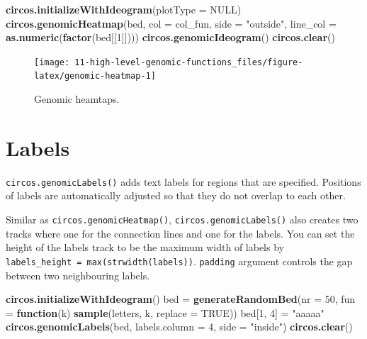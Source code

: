 \documentclass[]{book}
\newenvironment{Shaded}{\begin{snugshade}}{\end{snugshade}}
\newcommand{\KeywordTok}[1]{\textcolor[rgb]{0.13,0.29,0.53}{\textbf{#1}}}
\newcommand{\DataTypeTok}[1]{\textcolor[rgb]{0.13,0.29,0.53}{#1}}
\newcommand{\DecValTok}[1]{\textcolor[rgb]{0.00,0.00,0.81}{#1}}
\newcommand{\StringTok}[1]{\textcolor[rgb]{0.31,0.60,0.02}{#1}}
\newcommand{\OtherTok}[1]{\textcolor[rgb]{0.56,0.35,0.01}{#1}}
\newcommand{\ControlFlowTok}[1]{\textcolor[rgb]{0.13,0.29,0.53}{\textbf{#1}}}
\newcommand{\NormalTok}[1]{#1}
\begin{document}
\begin{Shaded}
\begin{Highlighting}[]
\KeywordTok{circos.initializeWithIdeogram}\NormalTok{(}\DataTypeTok{plotType =} \OtherTok{NULL}\NormalTok{)}
\KeywordTok{circos.genomicHeatmap}\NormalTok{(bed, }\DataTypeTok{col =}\NormalTok{ col_fun, }\DataTypeTok{side =} \StringTok{"outside"}\NormalTok{,}
    \DataTypeTok{line_col =} \KeywordTok{as.numeric}\NormalTok{(}\KeywordTok{factor}\NormalTok{(bed[[}\DecValTok{1}\NormalTok{]])))}
\KeywordTok{circos.genomicIdeogram}\NormalTok{()}
\KeywordTok{circos.clear}\NormalTok{()}
\end{Highlighting}
\end{Shaded}

\begin{figure}

{\centering \texttt{[image: 11-high-level-genomic-functions\_files/figure-latex/genomic-heatmap-1]} 

}

\caption{Genomic heamtaps.}\label{fig:genomic-heatmap}
\end{figure}

\section{Labels}\label{labels}

\texttt{circos.genomicLabels()} adds text labels for regions that are
specified. Positions of labels are automatically adjusted so that they
do not overlap to each other.

Similar as \texttt{circos.genomicHeatmap()},
\texttt{circos.genomicLabels()} also creates two tracks where one for
the connection lines and one for the labels. You can set the height of
the labels track to be the maximum width of labels by
\texttt{labels\_height\ =\ max(strwidth(labels))}. \texttt{padding}
argument controls the gap between two neighbouring labels.

\begin{Shaded}
\begin{Highlighting}[]
\KeywordTok{circos.initializeWithIdeogram}\NormalTok{()}
\NormalTok{bed =}\StringTok{ }\KeywordTok{generateRandomBed}\NormalTok{(}\DataTypeTok{nr =} \DecValTok{50}\NormalTok{, }\DataTypeTok{fun =} \ControlFlowTok{function}\NormalTok{(k) }\KeywordTok{sample}\NormalTok{(letters, k, }\DataTypeTok{replace =} \OtherTok{TRUE}\NormalTok{))}
\NormalTok{bed[}\DecValTok{1}\NormalTok{, }\DecValTok{4}\NormalTok{] =}\StringTok{ "aaaaa"}
\KeywordTok{circos.genomicLabels}\NormalTok{(bed, }\DataTypeTok{labels.column =} \DecValTok{4}\NormalTok{, }\DataTypeTok{side =} \StringTok{"inside"}\NormalTok{)}
\KeywordTok{circos.clear}\NormalTok{()}
\end{Highlighting}
\end{Shaded}
\end{document}
